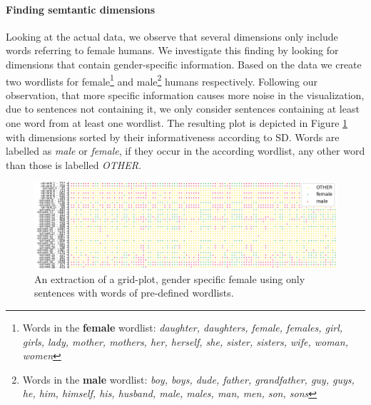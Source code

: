 \paragraph*{Finding semtantic dimensions}
Looking at the actual data, we observe that several dimensions only include words referring to female humans. We investigate this finding by looking for dimensions that contain gender-specific information. Based on the data we create two wordlists for female\footnote{Words in the \textbf{female} wordlist: \textit{daughter, daughters, female, females, girl, girls, lady, mother, mothers, her, herself, she, sister, sisters, wife, woman, women}} and male\footnote{Words in the \textbf{male} wordlist: \textit{boy, boys, dude, father, grandfather, guy, guys, he, him, himself, his, husband, male, males, man, men, son, sons}} humans respectively. Following our observation, that more specific information causes more noise in the visualization, due to sentences not containing it, we only consider sentences containing at least one word from at least one wordlist. The resulting plot is depicted in Figure \ref{fig:find_male_female} with dimensions sorted by their informativeness according to \ac{SD}. Words are labelled as \textit{male} or \textit{female}, if they occur in the according wordlist, any other word than those is labelled \textit{OTHER}.
\begin{figure}[tph!]
\centering
	\includegraphics[totalheight=5cm]{fig/findmf.png}
	\caption{An extraction of a grid-plot, gender specific female using only sentences with words of pre-defined wordlists.}
	\label{fig:find_male_female}
\end{figure}
